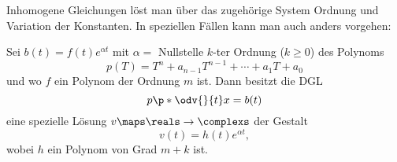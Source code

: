 \begin{bemerkung*}
  Inhomogene Gleichungen löst man über das zugehörige System  Ordnung und Variation der Konstanten. In speziellen Fällen kann man auch anders vorgehen:
\end{bemerkung*}
\begin{lemma}
  Sei \( b(t)=f(t)e^{\alpha t} \) mit \( \alpha= \) Nullstelle \( k \)-ter Ordnung (\( k\geq 0 \)) des Polynoms
  \begin{equation*}
    p(T)=T^n+a_{n-1} T^{n-1}+\dotsb+a_1 T+a_0
  \end{equation*}
  und wo \( f \) ein Polynom der Ordnung \( m \) ist. Dann besitzt die DGL
  \begin{equation*}
    p \p*{\odv{}{t}}x=b(t)
  \end{equation*}
  eine spezielle Lösung \( v\maps \reals\to \complexs \) der Gestalt
  \begin{equation*}
    v(t)=h(t) e^{\alpha t},
  \end{equation*}
  wobei \( h \) ein Polynom von Grad \( m+k \) ist.
\end{lemma}
